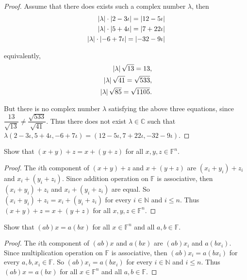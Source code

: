 \begin{proof}
    Assume that there does exists such a complex number $\lambda$, then
    \[
        \begin{split}
            \left\vert{\lambda}\right\vert\cdot\left\vert{2 - 3\iota}\right\vert = \left\vert{12 - 5\iota}\right\vert \\
            \left\vert{\lambda}\right\vert\cdot\left\vert{5 + 4\iota}\right\vert = \left\vert{7 + 22\iota}\right\vert \\
            \left\vert{\lambda}\right\vert\cdot\left\vert{-6 + 7\iota}\right\vert = \left\vert{-32 - 9\iota}\right\vert
        \end{split}
    \]

    equivalently,
    \[
        \begin{split}
            \left\vert{\lambda}\right\vert\sqrt{13} = 13,         \\
            \left\vert{\lambda}\right\vert\sqrt{41} = \sqrt{533}, \\
            \left\vert{\lambda}\right\vert\sqrt{85} = \sqrt{1105}.
        \end{split}
    \]

    But there is no complex number $\lambda$ satisfying the above three equations, since $\dfrac{13}{\sqrt{13}}\ne \dfrac{\sqrt{533}}{\sqrt{41}}$. Thus there does not exist $\lambda\in\mathbb{C}$ such that $\lambda (2 - 3\iota, 5 + 4\iota, -6 + 7\iota) = (12 - 5\iota, 7 + 22\iota, -32 - 9\iota)$.
\end{proof}

\begin{exercise}
    Show that $(x + y) + z = x + (y + z)$ for all $x, y, z\in \mathbb{F}^{n}$.
\end{exercise}

\begin{proof}
    The $i$th component of $(x + y) + z$ and $x + (y + z)$ are $(x_{i} + y_{i}) + z_{i}$ and $x_{i} + (y_{i} + z_{i})$. Since addition operation on $\mathbb{F}$ is associative, then $(x_{i} + y_{i}) + z_{i}$ and $x_{i} + (y_{i} + z_{i})$ are equal. So $(x_{i} + y_{i}) + z_{i} = x_{i} + (y_{i} + z_{i})$ for every $i\in\mathbb{N}$ and $i\leq n$. Thus $(x + y) + z = x + (y + z)$ for all $x, y, z\in \mathbb{F}^{n}$.
\end{proof}

\begin{exercise}
    Show that $(ab)x = a(bx)$ for all $x\in\mathbb{F}^{n}$ and all $a, b\in\mathbb{F}$.
\end{exercise}

\begin{proof}
    The $i$th component of $(ab)x$ and $a(bx)$ are $(ab)x_{i}$ and $a(bx_{i})$. Since multiplication operation on $\mathbb{F}$ is associative, then $(ab)x_{i} = a(bx_{i})$ for every $a, b, x_{i}\in\mathbb{F}$. So $(ab)x_{i} = a(bx_{i})$ for every $i\in\mathbb{N}$ and $i\leq n$. Thus $(ab)x = a(bx)$ for all $x\in\mathbb{F}^{n}$ and all $a, b\in\mathbb{F}$.
\end{proof}

